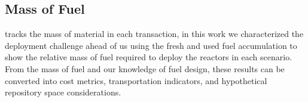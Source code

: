 \subsection{Mass of Fuel}
\label{sec:mass_of_fuel}

\cyclus tracks the mass of material in each transaction, in this work we characterized the deployment challenge ahead of us using the fresh and used fuel accumulation to show the relative mass of fuel required to deploy the reactors in each scenario. From the mass of fuel and our knowledge of fuel design, these results can be converted into cost metrics, transportation indicators, and hypothetical repository space considerations.